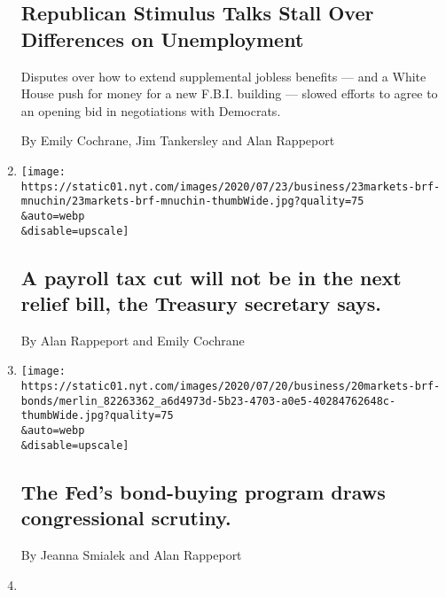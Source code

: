 \begin{enumerate}
{  \subsection{Republican Stimulus Talks Stall Over Differences on
  Unemployment}\label{republican-stimulus-talks-stall-over-differences-on-unemployment}}

  Disputes over how to extend supplemental jobless benefits --- and a
  White House push for money for a new F.B.I. building --- slowed
  efforts to agree to an opening bid in negotiations with Democrats.

  By Emily Cochrane, Jim Tankersley and Alan Rappeport
\item
  \href{/live/2020/07/23/business/stock-market-today-coronavirus/a-payroll-tax-cut-will-not-be-in-the-next-relief-bill-the-treasury-secretary-says}{}

  \texttt{[image: https://static01.nyt.com/images/2020/07/23/business/23markets-brf-mnuchin/23markets-brf-mnuchin-thumbWide.jpg?quality=75\\\&auto=webp\\\&disable=upscale]}

  \hypertarget{a-payroll-tax-cut-will-not-be-in-the-next-relief-bill-the-treasury-secretary-says}{%
  \subsection{A payroll tax cut will not be in the next relief bill, the
  Treasury secretary
  says.}\label{a-payroll-tax-cut-will-not-be-in-the-next-relief-bill-the-treasury-secretary-says}}

  By Alan Rappeport and Emily Cochrane
\item
  \href{/live/2020/07/20/business/stock-market-today-coronavirus/the-feds-bond-buying-program-draws-congressional-scrutiny}{}

  \texttt{[image: https://static01.nyt.com/images/2020/07/20/business/20markets-brf-bonds/merlin\_82263362\_a6d4973d-5b23-4703-a0e5-40284762648c-thumbWide.jpg?quality=75\\\&auto=webp\\\&disable=upscale]}

  \hypertarget{the-feds-bond-buying-program-draws-congressional-scrutiny}{%
  \subsection{The Fed's bond-buying program draws congressional
  scrutiny.}\label{the-feds-bond-buying-program-draws-congressional-scrutiny}}

  By Jeanna Smialek and Alan Rappeport
\item
  \href{/live/2020/07/20/business/stock-market-today-coronavirus/congressional-republicans-and-the-white-house-are-still-debating-the-next-aid-bill}{}


\end{enumerate}
